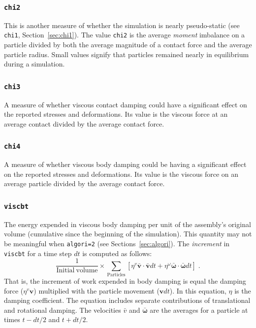 \documentclass[letterpaper,11pt]{article}
\begin{document}
\subsubsection{\texttt{chi2}}\label{sec:chi2}
This is another measure of whether the simulation is nearly
pseudo-static (see \texttt{chi1}, Section~\ref{sec:chi1}).
The value \texttt{chi2} is the average \emph{moment} imbalance on a 
particle divided by both the average magnitude of a contact force and the
average particle radius.
Small values signify that particles remained nearly in equilibrium 
during a simulation.
%
\subsubsection{\texttt{chi3}}
A measure of whether viscous contact damping could 
have a significant effect
on the reported stresses and deformations.
Its value is the viscous force at an average contact divided
by the average contact force.
%
\subsubsection{\texttt{chi4}}\label{sec:chi4}
A measure of whether viscous body damping could 
be having a significant effect
on the reported stresses and deformations.
Its value is the viscous force on an average particle divided
by the average contact force.
%
\subsubsection{\texttt{viscbt}}
The energy expended in viscous body damping per unit of the
assembly's original volume
(cumulative since the beginning of the simulation).  This quantity may not
be meaningful when \texttt{algori=2}
(see Sections~\ref{sec:algori}).
The \emph{increment} in \texttt{viscbt} for a time step $dt$
is computed as follows:
\begin{equation}
\frac{1}{\mathrm{Initial\ volume}}
\times
\sum_{\text{Particles}} \left[
\eta^{v}\mathbf{\bar{v}}\cdot\mathbf{\bar{v}}dt
+
\eta^{\omega}\bar{\boldsymbol{\omega}}\cdot\bar{\boldsymbol{\omega}}dt
\right]\;.
\end{equation}
That is, the increment of work expended in body damping is equal
the damping force ($\eta^{v}\mathbf{v}$) 
multiplied with the particle movement ($\mathbf{v}dt$).
In this equation, $\eta$ is the damping coefficient.
The equation includes separate contributions of translational and
rotational damping.
The velocities $\bar{v}$ and $\bar{\boldsymbol{\omega}}$ are the
averages for a particle at times $t-dt/2$ and $t+dt/2$.
%
\end{document}
